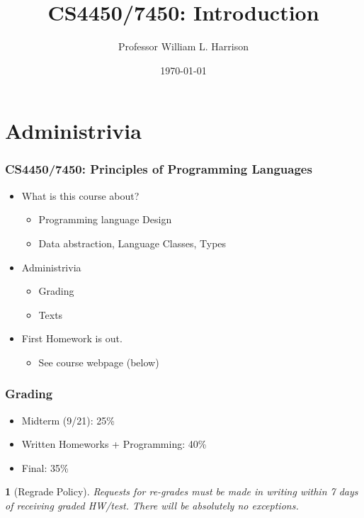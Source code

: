 \documentclass{beamer}
\title{CS4450/7450: Introduction}
\author{Professor William L. Harrison}
\date{\today}
\newtheorem{remark}{}
\begin{document}
\section{Administrivia}

\frame{\titlepage}


\frame
{
    \frametitle{CS4450/7450: Principles of Programming Languages}
    
\begin{itemize}
\item What is this course about?
\begin{itemize}
\item Programming language Design
\pause
\item Data abstraction, Language Classes, Types
\end{itemize}
\pause

\item Administrivia
\begin{itemize}
\item Grading
\item Texts
\end{itemize}
\pause

\item First Homework is out. 
\begin{itemize}
\item See course webpage (below)
\end{itemize}

\end{itemize}
}

\frame
{
    \frametitle{Grading}
    
\begin{itemize}
\item Midterm (9/21): 25\%

\item Written Homeworks + Programming: 40\%

\item Final: 35\%

\end{itemize}

\begin{remark}[Regrade Policy]
Requests for re-grades must be made in writing within 7 days of 
receiving graded HW/test. There will be absolutely no exceptions.
\end{remark}
}
\end{document}
